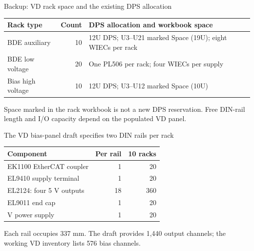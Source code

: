 \begin{frame}{Backup: VD rack space and the existing DPS allocation}
  \renewcommand{\arraystretch}{1.4}
  \begin{tabularx}{\textwidth}{@{}>{\RaggedRight\arraybackslash}p{3.4cm}r>{\RaggedRight\arraybackslash}X@{}}
    \toprule
    \textbf{Rack type} & \textbf{Count} & \textbf{DPS allocation and workbook space}\\
    \midrule
    BDE auxiliary & 10 & 12U DPS; U3--U21 marked Space (19U); eight WIECs per rack\\
    BDE low voltage & 20 & One PL506 per rack; four WIECs per supply\\
    Bias high voltage & 10 & 12U DPS; U3--U12 marked Space (10U)\\
    \bottomrule
  \end{tabularx}\par
  \bigskip
  Space marked in the rack workbook is not a new DPS reservation.
  Free DIN-rail length and I/O capacity depend on the populated VD panel.
\end{frame}

\begin{frame}{The VD bias-panel draft specifies two DIN rails per rack}
  \renewcommand{\arraystretch}{1.3}
  \begin{tabularx}{\textwidth}{@{}>{\RaggedRight\arraybackslash}Xrr@{}}
    \toprule
    \textbf{Component} & \textbf{Per rail} & \textbf{10 racks}\\
    \midrule
    EK1100 EtherCAT coupler & 1 & 20\\
    EL9410 supply terminal & 1 & 20\\
    EL2124: four 5 V outputs & 18 & 360\\
    EL9011 end cap & 1 & 20\\
    24 V power supply & 1 & 20\\
    \bottomrule
  \end{tabularx}\par
  \medskip
  Each rail occupies 337 mm. The draft provides 1,440 output channels;
  the working VD inventory lists 576 bias channels.\par
\end{frame}

